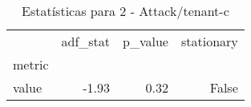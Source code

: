 \begin{table}[htbp]
\caption{Estatísticas para 2 - Attack/tenant-c}
\label{tab:2_-_attack_tenant-c_adf_test}
\begin{tabular}{lrrr}
\toprule
 & adf_stat & p_value & stationary \\
metric &  &  &  \\
\midrule
value & -1.93 & 0.32 & False \\
\bottomrule
\end{tabular}
\end{table}
